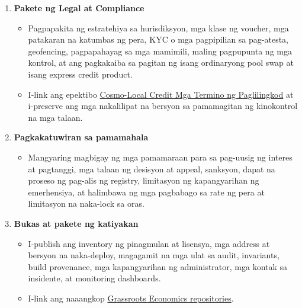 \documentclass[11pt]{article}
\begin{document}
\begin{enumerate}[leftmargin=*]
\begin{itemize}[leftmargin=*]
\end{itemize}
\item \textbf{Pakete ng Legal at Compliance}
\begin{itemize}[leftmargin=*]
\item Pagpapakita ng estratehiya sa hurisdiksyon, mga klase ng voucher, mga patakaran na katumbas ng pera, KYC o mga pagpipilian sa pag-atesta, geofencing, pagpapahayag sa mga mamimili, maling pagpupunta ng mga kontrol, at ang pagkakaiba sa pagitan ng isang ordinaryong pool swap at isang express credit product.
\item I-link ang epektibo \href{https://docs.cosmolocal.credit/fil/governance/terms}{Cosmo-Local Credit Mga Termino ng Paglilingkod} at i-preserve ang mga nakalilipat na bersyon sa pamamagitan ng kinokontrol na mga talaan.
\end{itemize}
\item \textbf{Pagkakatuwiran sa pamamahala}
\begin{itemize}[leftmargin=*]
\item Mangyaring magbigay ng mga pamamaraan para sa pag-uusig ng interes at pagtanggi, mga talaan ng desisyon at appeal, sanksyon, dapat na proseso ng pag-alis ng registry, limitasyon ng kapangyarihan ng emerhensiya, at halimbawa ng mga pagbabago sa rate ng pera at limitasyon na naka-lock sa oras.
\end{itemize}
\item \textbf{Bukas at pakete ng katiyakan}
\begin{itemize}[leftmargin=*]
\item I-publish ang inventory ng pinagmulan at lisensya, mga address at bersyon na naka-deploy, magagamit na mga ulat sa audit, invariants, build provenance, mga kapangyarihan ng administrator, mga kontak sa insidente, at monitoring dashboards.
\item I-link ang naaangkop \href{https://github.com/grassrootseconomics}{Grassroots Economics repositories}.
\end{itemize}
\end{enumerate}
\end{document}
